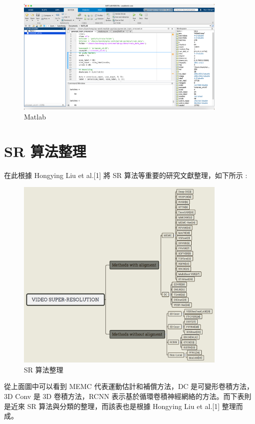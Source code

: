 \documentclass[11pt,UTF8]{ctexart}
\begin{document}
\begin{figure}[H]
\centering 
\includegraphics[width=0.9\textwidth]{m1.png} 
\caption{Matlab}
\label{Test}
\end{figure}


\newpage

\section{SR 算法整理}

在此根據 Hongying Liu et al.[1] 將 SR 算法等重要的研究文獻整理，如下所示 : 


\begin{figure}[H]
\centering 
\includegraphics[width=0.9\textwidth]{sr1.png} 
\caption{SR 算法整理}
\label{Test}
\end{figure}

從上面圖中可以看到 MEMC 代表運動估計和補償方法，DC 是可變形卷積方法，3D Conv 是 3D 卷積方法，RCNN 表示基於循環卷積神經網絡的方法。而下表則是近來 SR 算法與分類的整理，而該表也是根據 Hongying Liu et al.[1] 整理而成。
\end{document}
